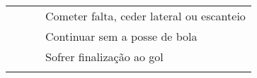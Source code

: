 \documentclass{memoir}
\begin{document}
\begin{table}
\begin{tabularx}{\linewidth}{@{}lllD{7cm}@{}}
                                                      &                            &                                       & Cometer falta, ceder lateral ou escanteio \\
                                                      &                            &                                       & Continuar sem a posse de bola             \\
                                                      &                            &                                       & Sofrer finalização ao gol                 \\ \midrule
                                                      &                            &                                       &                                          
\end{tabularx}
\endgroup
\end{table}
\end{document}
